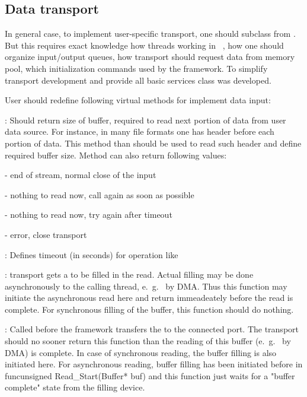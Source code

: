 \subsection{Data transport}

In general case, to implement user-specific transport, one should subclass from
. But this requires exact knowledge how threads working in \dabc~,
how one should organize input/output queues, how transport should request data from
memory pool, which initialization commands used by the framework. 
To simplify transport development and provide all basic services 
class  was developed.  

User should redefine following virtual methods for implement data input: 

\bbul
\item [\func{Read\_Size()}] : 
   Should return size of buffer, required to read next portion of data from
   user data source. For instance, in many file formats one has header before
   each portion of data. This method than should be used to read such header
   and define required buffer size. Method can also return following values:
   \bdes
   \item[\keyw{di\_EndOfStream}] - end of stream, normal close of the input
   \item[\keyw{di\_Repeat}]      - nothing to read now, call again as soon as possible
   \item[\keyw{di\_RepeatTimeout}] - nothing to read now, try again after timeout
   \item[\keyw{di\_Error}]         - error, close transport
   \edes

\item [\func{Read\_Timeout()}] :
   Defines timeout (in seconds) for operation like 
   
\item [\func{Read\_Start()}] : transport gets a 
    to be filled in the read. Actual filling may be done
   asynchronously to the calling thread, e.~g.~ by DMA. Thus
   this function may initiate the asynchronous read here and return
   immeadeately before the read is complete. 
   For synchronous filling of the buffer, this function should do nothing.
   
   
\item [\func{Read\_Complete()}] :
   Called before the framework transfers the 
   to the connected port. The transport should no sooner return this function
    than the reading of this buffer (e.~g.~ by DMA) 
    is complete. In case of synchronous reading, the buffer filling is also
    initiated here. For asynchronous reading, 
    buffer filling has been initiated before
    in func{unsigned Read\_Start(Buffer* buf)} and this function just waits
    for a "buffer complete" state from the filling device.
      
